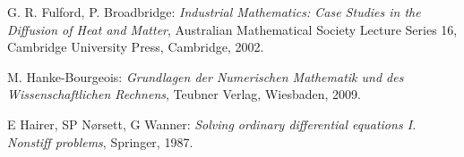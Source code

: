\documentclass[12pt,a4paper]{book}
\theoremstyle{break}
\theoremstyle{nonumberplain}
\newcommand{\R}{\mathbbm R}
\newcommand{\1}{\mathbbm{1}} 			      	%
\begin{document}
\begin{thebibliography}{100}

G. R. Fulford, P. Broadbridge: \emph{Industrial Mathematics: Case Studies in the Diffusion of Heat and Matter}, 
Australian Mathematical Society Lecture Series 16, Cambridge University Press, Cambridge, 2002.

M. Hanke-Bourgeois: \emph{Grundlagen der Numerischen Mathematik und des Wissenschaftlichen Rechnens}, Teubner Verlag, Wiesbaden, 2009. 

E Hairer, SP N{\o}rsett, G Wanner: 
\emph{Solving ordinary differential equations I. Nonstiff problems},
Springer, 1987.








\end{thebibliography}
\end{document}

